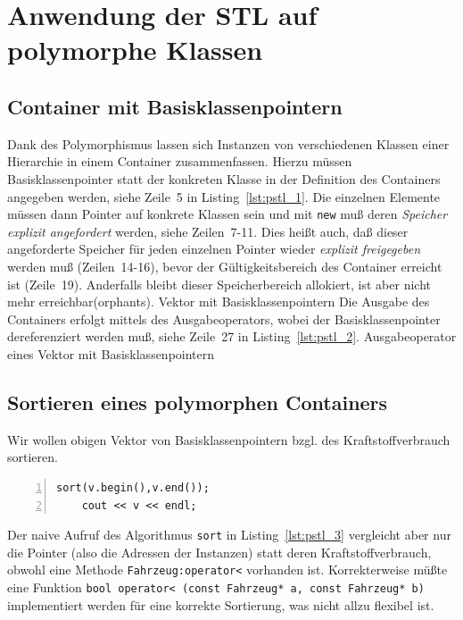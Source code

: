 \section{Anwendung der STL auf polymorphe Klassen}
\label{sec:A3}
%
\subsection{Container mit Basisklassenpointern}
\label{sec:A3.1}
%
Dank des Polymorphismus lassen sich Instanzen von verschiedenen Klassen einer Hierarchie in einem Container 
zusammenfassen. Hierzu müssen Basisklassenpointer statt der konkreten Klasse in der Definition 
des Containers angegeben werden, siehe Zeile~5 in Listing~\ref{lst:pstl_1}. 
Die einzelnen Elemente müssen dann Pointer auf konkrete Klassen sein und mit \texttt{new} muß deren 
\emph{Speicher explizit angefordert} werden, siehe Zeilen~7-11. Dies heißt auch, daß dieser 
angeforderte Speicher für jeden einzelnen Pointer wieder \emph{explizit freigegeben} werden muß 
(Zeilen~14-16), bevor 
der Gültigkeitsbereich des Container erreicht ist (Zeile~19).
Anderfalls bleibt dieser Speicherbereich allokiert, ist aber nicht mehr erreichbar(orphants).
\mbox{}
{Vektor mit Basisklassenpointern}
%
Die Ausgabe des Containers erfolgt mittels des Ausgabeoperators, wobei der Basisklassenpointer 
dereferenziert werden muß, siehe Zeile~27 in Listing~\ref{lst:pstl_2}.
%
{Ausgabeoperator eines Vektor mit Basisklassenpointern}
%
%
%
\subsection{Sortieren eines polymorphen Containers}
\label{sec:A3.2}
%
Wir wollen obigen Vektor von Basisklassenpointern bzgl. des Kraftstoffverbrauch sortieren.
%
\begin{lstlisting}[caption={Inkorrektes Sortieren},label=lst:pstl_3,
basicstyle=\scriptsize,numbers=left, numberstyle=\tiny, stepnumber=2, numbersep=5pt]
    sort(v.begin(),v.end());
    cout << v << endl;
\end{lstlisting}
Der naive Aufruf des Algorithmus \texttt{sort} in Listing~\ref{lst:pstl_3} vergleicht aber nur die 
Pointer (also die Adressen der Instanzen) statt deren Kraftstoffverbrauch, obwohl eine Methode 
\verb|Fahrzeug:operator<| vorhanden ist. 
Korrekterweise müßte eine Funktion \verb|bool operator< (const Fahrzeug* a, const Fahrzeug* b)| 
implementiert werden für eine korrekte Sortierung, was nicht allzu flexibel ist.

